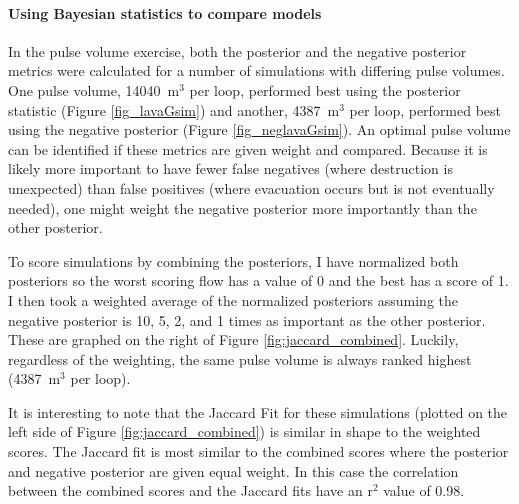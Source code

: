 \documentclass[12pt,letter]{article}
\begin{document}
\paragraph{Using Bayesian statistics to compare models}

In the pulse volume exercise, both the posterior and the negative posterior metrics were calculated for a number of simulations with differing pulse volumes. One pulse volume, 14040~m$^3$ per loop, performed best using the posterior statistic (Figure \ref{fig_lavaGsim}) and another, 4387~m$^3$ per loop, performed best using the negative posterior (Figure \ref{fig_neglavaGsim}). An optimal pulse volume can be identified if these metrics are given weight and compared. Because it is likely more important to have fewer false negatives (where destruction is unexpected) than false positives (where evacuation occurs but is not eventually needed), one might weight the negative posterior more importantly than the other posterior.

To score simulations by combining the posteriors, I have normalized both posteriors so the worst scoring flow has a value of 0 and the best has a score of 1. I then took a weighted average of the normalized posteriors assuming the negative posterior is 10, 5, 2, and 1 times as important as the other posterior. These are graphed on the right of Figure \ref{fig:jaccard_combined}. Luckily, regardless of the weighting, the same pulse volume is always ranked highest (4387~m$^3$ per loop).

It is interesting to note that the Jaccard Fit for these simulations (plotted on the left side of Figure \ref{fig:jaccard_combined}) is similar in shape to the weighted scores. The Jaccard fit is most similar to the combined scores where the posterior and negative posterior are given equal weight. In this case the correlation between the combined scores and the Jaccard fits have an r$^2$ value of 0.98.

\end{document}
